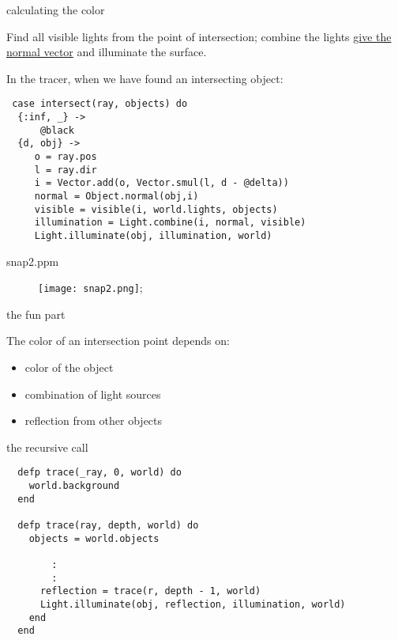 \begin{frame}[fragile]{calculating the color}

  Find all visible lights from the point of intersection; combine the
  lights \underline{give the normal vector} and illuminate the
  surface.  \pause

  In the tracer, when we have found an intersecting object:

\begin{verbatim}
 case intersect(ray, objects) do
  {:inf, _} ->
      @black
  {d, obj} ->
     o = ray.pos
     l = ray.dir
     i = Vector.add(o, Vector.smul(l, d - @delta))
     normal = Object.normal(obj,i)
     visible = visible(i, world.lights, objects)
     illumination = Light.combine(i, normal, visible)
     Light.illuminate(obj, illumination, world)
 \end{verbatim}

\end{frame}


\begin{frame}{snap2.ppm}

\begin{figure}
\texttt{[image: snap2.png]};
\end{figure}

\end{frame}

\begin{frame}{the fun part}

The color of an intersection point depends on:

\begin{itemize}
 \pause \item color of the object
 \pause \item combination of light sources 
 \pause \item reflection from other objects
\end{itemize}

\end{frame}


\begin{frame}[fragile]{the recursive call}

\pause 
\begin{verbatim}
  defp trace(_ray, 0, world) do
    world.background
  end

  defp trace(ray, depth, world) do
    objects = world.objects

        :
        :
      reflection = trace(r, depth - 1, world)
      Light.illuminate(obj, reflection, illumination, world)
    end
  end

\end{verbatim}

\end{frame}

